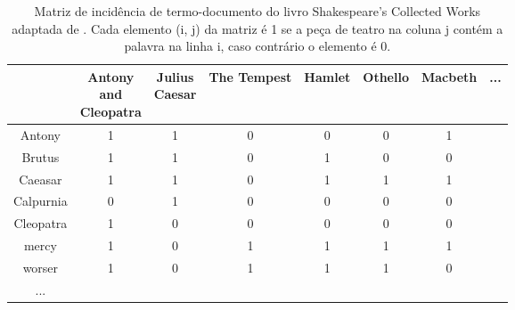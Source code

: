 \begin{table}[H]
    \centering
    \begin{tabular}{|c|c|c|c|c|c|c|c}
        \hline
        \diagbox{Palavra}{
            \raisebox{-1.27cm}{
                \rotatebox{90}{
                    \parbox{1.6cm}{\centering Peça \\ de teatro}
                }
            }
        } 
        & \makecell{Antony \\ and \\ Cleopatra} 
        & \makecell{Julius \\ Caesar} 
        & The Tempest 
        & Hamlet 
        & Othello 
        & Macbeth 
        & ... 
        \\ \hline
        Antony     & 1 & 1 & 0 & 0 & 0 & 1 & \\
        Brutus     & 1 & 1 & 0 & 1 & 0 & 0 & \\
        Caeasar    & 1 & 1 & 0 & 1 & 1 & 1 & \\
        Calpurnia  & 0 & 1 & 0 & 0 & 0 & 0 & \\
        Cleopatra  & 1 & 0 & 0 & 0 & 0 & 0 & \\
        mercy      & 1 & 0 & 1 & 1 & 1 & 1 & \\
        worser     & 1 & 0 & 1 & 1 & 1 & 0 & \\
        ...        & & & & & & & 
    \end{tabular}
    \caption{Matriz de incidência de termo-documento do livro Shakespeare’s Collected Works adaptada de . Cada elemento (i, j) da matriz é 1 se a peça de teatro na coluna j contém a palavra na linha i, caso contrário o elemento é 0.}
    \label{tab:matriz-incidência-termo-documento}
\end{table}